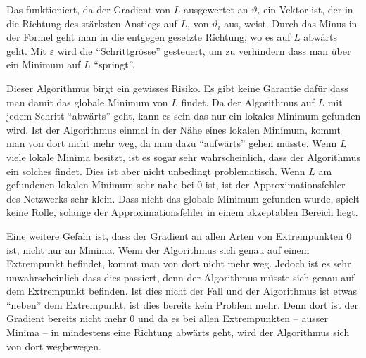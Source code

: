 Das funktioniert, da der Gradient von \( L \) ausgewertet an \( \vartheta_i \) ein Vektor ist, der in die Richtung des stärksten Anstiegs auf \( L \), von \(\vartheta_i \) aus, weist.
Durch das Minus in der Formel geht man in die entgegen gesetzte Richtung, wo es auf \( L \) abwärts geht. 
Mit \( \varepsilon \) wird die ``Schrittgrösse'' gesteuert, um zu verhindern dass man über ein Minimum auf \( L \) ``springt''.

Dieser Algorithmus birgt ein gewisses Risiko. 
Es gibt keine Garantie dafür dass man damit das globale Minimum von \( L \) findet.
Da der Algorithmus auf \( L \) mit jedem Schritt ``abwärts'' geht, kann es sein das nur ein lokales Minimum gefunden wird.
Ist der Algorithmus einmal in der Nähe eines lokalen Minimum, kommt man von dort nicht mehr weg, da man dazu ``aufwärts'' gehen müsste.
Wenn \( L \) viele lokale Minima besitzt, ist es sogar sehr wahrscheinlich, dass der Algorithmus ein solches findet.
Dies ist aber nicht unbedingt problematisch.
Wenn \( L \) am gefundenen lokalen Minimum sehr nahe bei 0 ist, ist der Approximationsfehler des Netzwerks sehr klein.
Dass nicht das globale Minimum gefunden wurde, spielt keine Rolle, solange der Approximationsfehler in einem akzeptablen Bereich liegt.

Eine weitere Gefahr ist, dass der Gradient an allen Arten von Extrempunkten 0 ist, nicht nur an Minima.
Wenn der Algorithmus sich genau auf einem Extrempunkt befindet, kommt man von dort nicht mehr weg.
Jedoch ist es sehr unwahrscheinlich dass dies passiert, denn der Algorithmus müsste sich genau auf dem Extrempunkt befinden.
Ist dies nicht der Fall und der Algorithmus ist etwas ``neben'' dem Extrempunkt, ist dies bereits kein Problem mehr.
Denn dort ist der Gradient bereits nicht mehr 0 und da es bei allen Extrempunkten -- ausser Minima -- in mindestens eine Richtung abwärts geht, wird der Algorithmus sich von dort wegbewegen.

